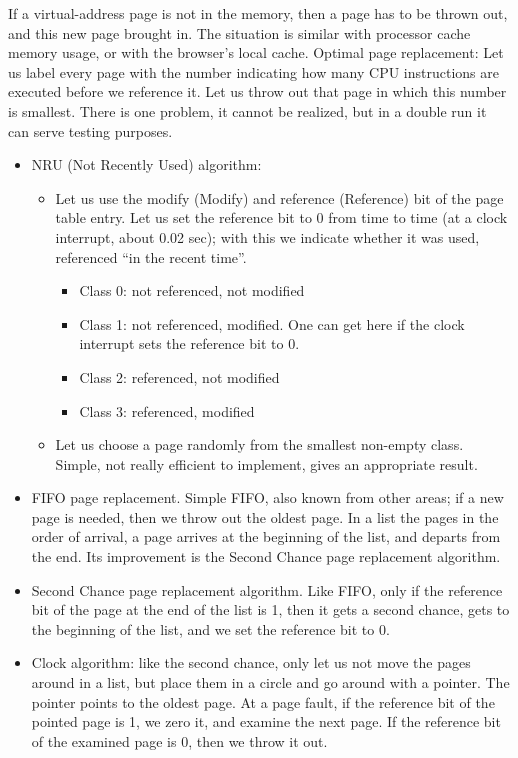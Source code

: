 \documentclass[margin=0px]{article}
\begin{document}
If a virtual-address page is not in the memory, then a page has to be thrown out, and this new page brought in. The situation is similar with processor cache memory usage, or with the browser's local cache.
Optimal page replacement: Let us label every page with the number indicating how many CPU instructions are executed before we reference it. Let us throw out that page in which this number is smallest. There is one problem, it cannot be realized, but in a double run it can serve testing purposes.
\begin{itemize}
    \item NRU (Not Recently Used) algorithm:
          \begin{itemize}
              \item Let us use the modify (Modify) and reference (Reference) bit of the page table entry. Let us set the reference bit to 0 from time to time (at a clock interrupt, about 0.02 sec); with this we indicate whether it was used, referenced ``in the recent time''.
                    \begin{itemize}
                        \item Class 0: not referenced, not modified
                        \item Class 1: not referenced, modified. One can get here if the clock interrupt sets the reference bit to 0.
                        \item Class 2: referenced, not modified
                        \item Class 3: referenced, modified
                    \end{itemize}
              \item Let us choose a page randomly from the smallest non-empty class. Simple, not really efficient to implement, gives an appropriate result.
          \end{itemize}
    \item FIFO page replacement. Simple FIFO, also known from other areas; if a new page is needed, then we throw out the oldest page. In a list the pages in the order of arrival, a page arrives at the beginning of the list, and departs from the end. Its improvement is the Second Chance page replacement algorithm.
    \item Second Chance page replacement algorithm. Like FIFO, only if the reference bit of the page at the end of the list is 1, then it gets a second chance, gets to the beginning of the list, and we set the reference bit to 0.
    \item Clock algorithm: like the second chance, only let us not move the pages around in a list, but place them in a circle and go around with a pointer. The pointer points to the oldest page. At a page fault, if the reference bit of the pointed page is 1, we zero it, and examine the next page. If the reference bit of the examined page is 0, then we throw it out.

\end{itemize}
\end{document}
